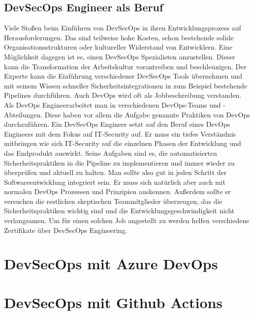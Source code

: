 \section{DevSecOps Engineer als Beruf}
Viele Stoßen beim Einführen von DevSecOps in ihren Entwicklungsprozess auf Herausforderungen. Das sind teilweise hohe Kosten, schon bestehende solide Organisationsstrukturen oder kultureller Widerstand von Entwicklern. Eine Möglichkeit dagegen ist es, einen DevSecOps Spezialisten anzustellen. Dieser kann die Transformation der Arbeitskultur vorantreiben und beschleunigen. Der Experte kann die Einführung verschiedener DevSecOps Tools übernehmen und mit seinem Wissen schneller Sicherheitsintegrationen in zum Beispiel bestehende Pipelines durchführen. \cite{grey}
Auch DevOps wird oft als Jobbeschreibung verstanden. Als \glqq DevOps Engineer\grqq arbeitet man in verschiedenen DevOps-Teams und -Abteilungen. Diese haben vor allem die Aufgabe genannte Praktiken von DevOps durchzuführen. \cite{dev-ops}
Ein DevSecOps Engineer setzt auf den Beruf eines DevOps Engineers mit dem Fokus auf IT-Security auf. Er muss ein tiefes Verständnis mitbringen wie sich IT-Security auf die einzelnen Phasen der Entwicklung und das Endprodukt auswirkt. Seine Aufgaben sind es, die automatisierten Sicherheitspraktiken in die Pipeline zu implementieren und immer wieder zu überprüfen und aktuell zu halten. Man sollte also gut in jeden Schritt der Softwareentwicklung integriert sein. Er muss sich natürlich aber auch mit normalen DevOps Prozessen und Prinzipien auskennen. Außerdem sollte er versuchen die restlichen skeptischen Teammitglieder überzeugen, das die Sicherheitspraktiken wichtig sind und die Entwicklungsgeschwindigkeit nicht verlangsamen. Um für einen solchen Job angestellt zu werden helfen verschiedene Zertifikate über DevSecOps Engineering. \cite{Cobb2019-lq}


\chapter{DevSecOps mit Azure DevOps}

\chapter{DevSecOps mit Github Actions}

